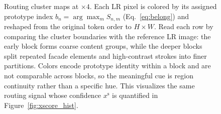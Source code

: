 \begin{figure}[H]
\centering
\figeightheader
\vspace{2pt}


\vspace{2pt}

\vspace{2pt}

\caption{Routing cluster maps at $\times4$. Each LR pixel is colored by its
assigned prototype index $b_n=\arg\max_m S_{n,m}$ (Eq.~\eqref{eq:belong}) and
reshaped from the original token order to $H\times W$. Read each row by comparing
the cluster boundaries with the reference LR image: the early block forms coarse
content groups, while the deeper blocks split repeated facade elements and
high-contrast strokes into finer partitions. Colors encode prototype identity
within a block and are not comparable across blocks, so the meaningful cue is
region continuity rather than a specific hue. This visualizes the same routing
signal whose confidence $x^{\mathrm{s}}$ is quantified in
Figure~\ref{fig:xscore_hist}.}
\label{fig:cluster_maps}
\end{figure}
